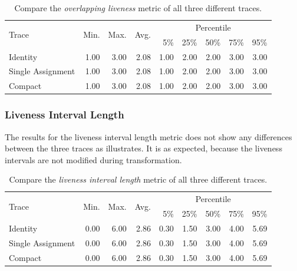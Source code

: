 \documentclass[onecolumn, openright, master, english, signatures]{dbrgrptt}
\begin{document}
\begin{table}[!ht]
  \centering
  \begin{tabular}{lrrrrrrrr}
    \hline
    \multirow{2}{*}{Trace} & \multirow{2}{*}{Min.} & \multirow{2}{*}{Max.} & \multirow{2}{*}{Avg.} & \multicolumn{5}{c}{Percentile} \tabularnewline
    & & & & 5\% & 25\% & 50\% & 75\% & 95\% \tabularnewline
    \hline
    Identity          & 1.00 & 3.00 & 2.08 & 1.00 & 2.00 & 2.00 & 3.00 & 3.00 \\
    Single Assignment & 1.00 & 3.00 & 2.08 & 1.00 & 2.00 & 2.00 & 3.00 & 3.00 \\
    Compact           & 1.00 & 3.00 & 2.08 & 1.00 & 2.00 & 2.00 & 3.00 & 3.00 \\
    \hline
  \end{tabular}
  \caption{Compare the \emph{overlapping liveness} metric of all three different \ac{trace}s.}
  \label{tab:summarizing-example-metrics-overview-concurrently-live}
\end{table}

\subsubsection{Liveness Interval Length}
The results for the liveness interval length metric does not show any differences between the three \ac{trace}s as  illustrates. It is as expected, because the liveness intervals are not modified during transformation.

\begin{table}[!ht]
  \centering
  \begin{tabular}{lrrrrrrrr}
    \hline
    \multirow{2}{*}{Trace} & \multirow{2}{*}{Min.} & \multirow{2}{*}{Max.} & \multirow{2}{*}{Avg.} & \multicolumn{5}{c}{Percentile} \tabularnewline
    & & & & 5\% & 25\% & 50\% & 75\% & 95\% \tabularnewline
    \hline
    Identity          & 0.00 & 6.00 & 2.86 & 0.30 & 1.50 & 3.00 & 4.00 & 5.69 \\
    Single Assignment & 0.00 & 6.00 & 2.86 & 0.30 & 1.50 & 3.00 & 4.00 & 5.69 \\
    Compact           & 0.00 & 6.00 & 2.86 & 0.30 & 1.50 & 3.00 & 4.00 & 5.69 \\
    \hline
  \end{tabular}
  \caption{Compare the \emph{liveness interval length} metric of all three different \ac{trace}s.}
  \label{tab:summarizing-example-metrics-overview-liveness-interval-length}
\end{table}
\end{document}
